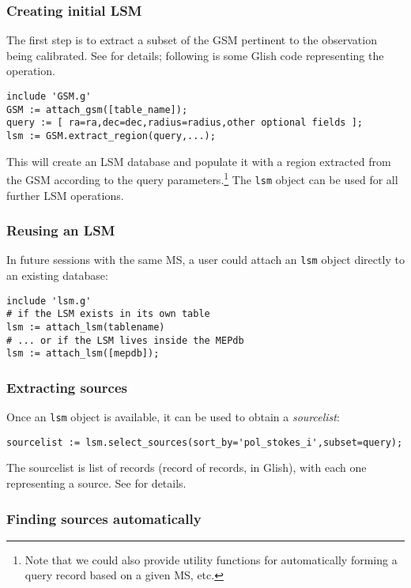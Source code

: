 \documentclass[12pt]{article}
\begin{document}
\subsubsection{Creating initial LSM}

  The first step is to extract a subset of the GSM pertinent to the observation
  being calibrated. See \cite{GSM} for details; following is some Glish code
  representing the operation.

\begin{verbatim}
include 'GSM.g'
GSM := attach_gsm([table_name]);   
query := [ ra=ra,dec=dec,radius=radius,other optional fields ];
lsm := GSM.extract_region(query,...);
\end{verbatim}

  This will create an LSM database and populate it with a region extracted from
  the GSM according to the query parameters.\footnote{Note that we could also
  provide utility functions for automatically forming a query record based on a
  given MS, etc.} The {\tt lsm} object can be used for all further LSM
  operations.

\subsubsection{Reusing an LSM}

  In future sessions with the same MS, a user could attach an {\tt lsm} object
  directly to an existing database:

\begin{verbatim}
include 'lsm.g'
# if the LSM exists in its own table
lsm := attach_lsm(tablename)
# ... or if the LSM lives inside the MEPdb
lsm := attach_lsm([mepdb]);
\end{verbatim}

\subsubsection{Extracting sources}

  Once an {\tt lsm} object is available, it can be used to obtain a {\em
  sourcelist}:

\begin{verbatim}
sourcelist := lsm.select_sources(sort_by='pol_stokes_i',subset=query); 
\end{verbatim}

  The sourcelist is list of records (record of records, in Glish), with each
  one representing a source. See \cite{GSM} for details. 

\subsubsection{Finding sources automatically}
\end{document}
